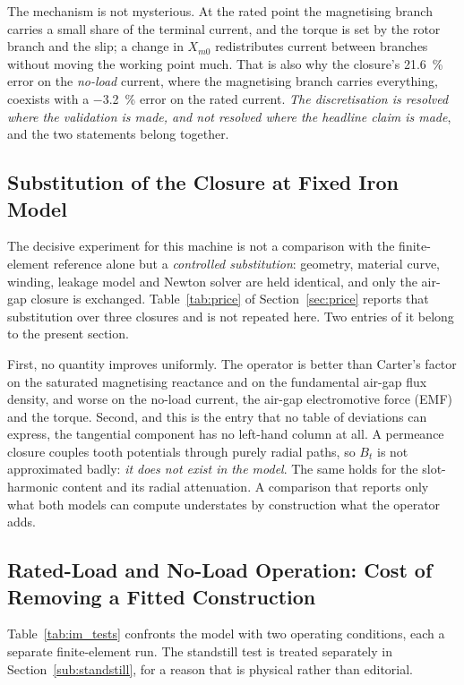 \documentclass[10pt,a4paper,twocolumn]{article}
\theoremstyle{plain}
\theoremstyle{remark}
\begin{document}
The mechanism is not mysterious. At the rated point the magnetising
branch carries a small share of the terminal current, and the torque is
set by the rotor branch and the slip; a change in $X_{m0}$ redistributes
current between branches without moving the working point much. That is
also why the closure's \SI{+21.6}{\percent} error on the \emph{no-load}
current, where the magnetising branch carries everything, coexists
with a \SI{-3.2}{\percent} error on the rated current. \emph{The
discretisation is resolved where the validation is made, and not
resolved where the headline claim is made}, and the two statements
belong together.

\subsection{Substitution of the Closure at Fixed Iron Model}
\label{sub:im_closure}

The decisive experiment for this machine is not a comparison with the
finite-element reference alone but a \emph{controlled substitution}:
geometry, material curve, winding, leakage model and Newton solver are
held identical, and only the air-gap closure is exchanged.
Table~\ref{tab:price} of Section~\ref{sec:price} reports that
substitution over three closures and is not repeated here. Two entries
of it belong to the present section.

First, no quantity improves uniformly. The operator is better than
Carter's factor on the saturated magnetising reactance and on the
fundamental air-gap flux density, and worse on the no-load current, the
air-gap electromotive force (EMF) and the torque. Second, and this is the
entry that no table of deviations can express, the tangential component
has no left-hand column at all. A permeance closure couples tooth
potentials through purely radial paths, so $B_t$ is not approximated
badly: \emph{it does not exist in the model}. The same holds for the
slot-harmonic content and its radial attenuation. A comparison that
reports only what both models can compute understates by construction
what the operator adds.

\subsection{Rated-Load and No-Load Operation: Cost of Removing a Fitted Construction}
\label{sub:im_tests}

Table~\ref{tab:im_tests} confronts the model with two operating
conditions, each a separate finite-element run. The standstill test is
treated separately in Section~\ref{sub:standstill}, for a reason that is
physical rather than editorial.
\end{document}
